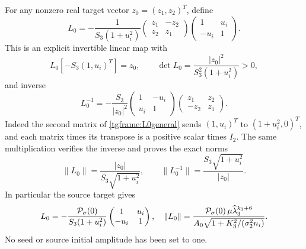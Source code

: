 \documentclass[11pt]{article}
\begin{document}
For any nonzero real target vector $z_0=(z_1,z_2)^T$, define
\begin{equation}\label{tgframe:L0general}
 L_0=-\frac1{S_3(1+u_i^2)}
 \begin{pmatrix}z_1&-z_2\\z_2&z_1\end{pmatrix}
 \begin{pmatrix}1&u_i\\-u_i&1\end{pmatrix}.
\end{equation}
This is an explicit invertible linear map with
\[
 L_0[-S_3(1,u_i)^T]=z_0,\qquad
 \det L_0=\frac{|z_0|^2}{S_3^2(1+u_i^2)}>0,
\]
and inverse
\begin{equation}\label{tgframe:L0inverse}
 L_0^{-1}=-\frac{S_3}{|z_0|^2}
       \begin{pmatrix}1&-u_i\\u_i&1\end{pmatrix}
       \begin{pmatrix}z_1&z_2\\-z_2&z_1\end{pmatrix}.
\end{equation}
Indeed the second matrix of \eqref{tgframe:L0general} sends
$(1,u_i)^T$ to $(1+u_i^2,0)^T$, and each matrix times its
transpose is a positive scalar times $I_2$.
The same multiplication verifies the inverse and proves the exact norms
\begin{equation}\label{tgframe:L0norms}
 \|L_0\|=\frac{|z_0|}{S_3\sqrt{1+u_i^2}},\qquad
 \|L_0^{-1}\|=\frac{S_3\sqrt{1+u_i^2}}{|z_0|}.
\end{equation}
In particular the source target gives
\[
 L_0=-\frac{{\cal P}_\sigma(0)}{S_3(1+u_i^2)}
        \begin{pmatrix}1&u_i\\-u_i&1\end{pmatrix},
 \quad
 \|L_0\|=
 \frac{{\cal P}_\sigma(0)\,\mu\widehat\lambda_3^{k_3+6}}
 {A_0\sqrt{1+K_3^2/(\sigma_2^2n_i)}}.
\]
No seed or source initial amplitude has been set to one.
\end{document}
